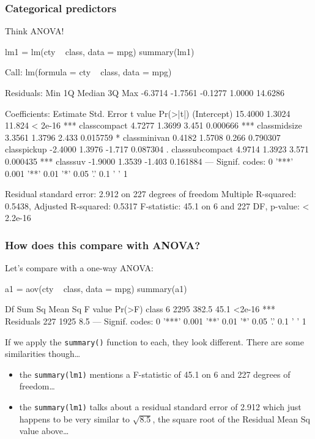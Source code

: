 \documentclass[a4paper]{article}
\begin{document}
\subsubsection{Categorical predictors}
Think ANOVA!
\begin{Schunk}
\begin{Sinput}
lm1 = lm(cty ~ class, data = mpg)
summary(lm1)
\end{Sinput}
\begin{Soutput}

Call:
lm(formula = cty ~ class, data = mpg)

Residuals:
    Min      1Q  Median      3Q     Max 
-6.3714 -1.7561 -0.1277  1.0000 14.6286 

Coefficients:
                Estimate Std. Error t value Pr(>|t|)    
(Intercept)      15.4000     1.3024  11.824  < 2e-16 ***
classcompact      4.7277     1.3699   3.451 0.000666 ***
classmidsize      3.3561     1.3796   2.433 0.015759 *  
classminivan      0.4182     1.5708   0.266 0.790307    
classpickup      -2.4000     1.3976  -1.717 0.087304 .  
classsubcompact   4.9714     1.3923   3.571 0.000435 ***
classsuv         -1.9000     1.3539  -1.403 0.161884    
---
Signif. codes:  0 '***' 0.001 '**' 0.01 '*' 0.05 '.' 0.1 ' ' 1

Residual standard error: 2.912 on 227 degrees of freedom
Multiple R-squared:  0.5438,	Adjusted R-squared:  0.5317 
F-statistic:  45.1 on 6 and 227 DF,  p-value: < 2.2e-16
\end{Soutput}
\end{Schunk}
\subsubsection{How does this compare with ANOVA?}
Let's compare with a one-way ANOVA:
\begin{Schunk}
\begin{Sinput}
a1 = aov(cty ~ class, data = mpg)
summary(a1)
\end{Sinput}
\begin{Soutput}
             Df Sum Sq Mean Sq F value Pr(>F)    
class         6   2295   382.5    45.1 <2e-16 ***
Residuals   227   1925     8.5                   
---
Signif. codes:  0 '***' 0.001 '**' 0.01 '*' 0.05 '.' 0.1 ' ' 1
\end{Soutput}
\end{Schunk}
If we apply the \lstinline|summary()| function to each, they look different.
There are some similarities though\dots
\begin{itemize}
	\item the \lstinline|summary(lm1)| mentions a F-statistic of 45.1 on 6 and 227 degrees of freedom\dots
	\item the \lstinline|summary(lm1)| talks about a residual standard error of 2.912 which just happens to be very similar to \( \sqrt{8.5} \), the square root of the Residual Mean Sq value above\dots
\end{itemize}
\end{document}
